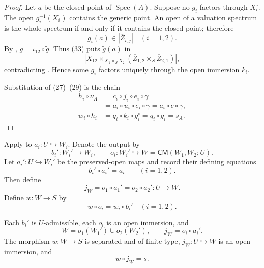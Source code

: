 \begin{proof}
  Let $a$ be the closed point of $\operatorname{Spec}(A)$.  Suppose no $g_i$
  factors through $X_i^\circ$.  The open $g_i^{-1}(X_i^\circ)$ contains the
  generic point.  An open of a valuation spectrum is the whole spectrum if
  and only if it contains the closed point; therefore
  \[
    g_i(a)\in|\overline Z_{i,j}|\quad(i=1,2).                     \tag{33}
  \]
  By ,
  $g=\iota_{12}\circ\widetilde g$.  Thus (33) puts $\widetilde g(a)$ in
  \[
    \left|
      X_{12}\times_{X_1\times_SX_2}
        (\overline Z_{1,2}\times_S\overline Z_{2,1})
    \right|,
  \]
  contradicting .  Hence some
  $g_i$ factors uniquely through the open immersion $k_i$.

  Substitution of (27)--(29) is the chain
  \[
  \begin{aligned}
    h_i\circ\nu_A
      &=c_i\circ j_i^\circ\circ e_i\circ\gamma\\
      &=a_i\circ u_i\circ e_i\circ\gamma
       =a_i\circ e\circ\gamma,\\
    w_i\circ h_i
      &=q_i\circ k_i\circ g_i^\circ
       =q_i\circ g_i
       =s_A.
  \end{aligned}
  \]
\end{proof}

\begin{definition}
  \label{def:nagata-two-open-final-modification}
  \lean{}

  Apply  to
  $a_i\colon U\hookrightarrow W_i$.  Denote the output by
  \[
    b_i'\colon W_i'\to W_i,\qquad
    o_i\colon W_i'\hookrightarrow W=\mathsf{CM}(W_1,W_2;U).
  \]
  Let $a_i'\colon U\hookrightarrow W_i'$ be the preserved-open maps and
  record their defining equations
  \[
    b_i'\circ a_i'=a_i\qquad(i=1,2).                             \tag{33a}
  \]
  Then define
  \[
    j_W=o_1\circ a_1'=o_2\circ a_2'\colon U\to W.                 \tag{34}
  \]
  Define $w\colon W\to S$ by
  \[
    w\circ o_i=w_i\circ b_i'\quad(i=1,2).                         \tag{35}
  \]
\end{definition}

\begin{lemma}
  \label{lemma:nagata-two-open-final-modification}
  \lean{}

  Each $b_i'$ is $U$-admissible, each $o_i$ is an open immersion, and
  \[
    W=o_1(W_1')\cup o_2(W_2'),\qquad
    j_W=o_i\circ a_i'.
  \]
  The morphism $w\colon W\to S$ is separated and of finite type,
  $j_W\colon U\hookrightarrow W$ is an open immersion, and
  \[
    w\circ j_W=s.
  \]
\end{lemma}

